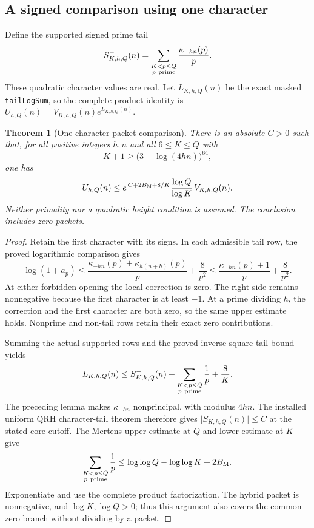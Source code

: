 \documentclass[11pt]{article}
\newtheorem{theorem}{Theorem}[section]
\begin{document}
\subsection{A signed comparison using one character}
Define the supported signed prime tail
\[
 S^-_{K,h,Q}(n)=
     \sum_{\substack{K<p\leq Q\\p\ {\rm prime}}}
                         \frac{\kappa_{-hn}(p)}p .
\]
These quadratic character values are real. Let \(L_{K,h,Q}(n)\)
be the exact masked \texttt{tailLogSum}, so the complete product
identity is \(U_{h,Q}(n)=V_{K,h,Q}(n)e^{L_{K,h,Q}(n)}\).

\begin{theorem}[One-character packet comparison]\label{thm:one-character-comparison}
There is an absolute \(C>0\) such that, for all positive integers
\(h,n\) and all \(6\leq K\leq Q\) with
\[
                   K+1\geq\bigl(3+\log(4hn)\bigr)^{64},
\]
one has
\[
 U_{h,Q}(n)\leq
 e^{\,C+2B_{\rm M}+8/K}\frac{\log Q}{\log K}\,
 V_{K,h,Q}(n).
\]
Neither primality nor a quadratic height condition is assumed.
The conclusion includes zero packets.
\end{theorem}
\begin{proof}
Retain the first character with its signs. In each admissible tail row,
the proved logarithmic comparison gives
\[
 \log(1+a_p)\leq
   \frac{\kappa_{-hn}(p)+\kappa_{h(n+h)}(p)}p+\frac8{p^2}
 \leq\frac{\kappa_{-hn}(p)+1}p+\frac8{p^2}.
\]
At either forbidden opening the local correction is zero. The right
side remains nonnegative because the first character is at least
\(-1\). At a prime dividing \(h\), the correction and the first
character are both zero, so the same upper estimate holds. Nonprime
and non-tail rows retain their exact zero contributions.

Summing the actual supported rows and the proved inverse-square tail
bound yields
\[
 L_{K,h,Q}(n)\leq
 S^-_{K,h,Q}(n)+
 \sum_{\substack{K<p\leq Q\\p\ {\rm prime}}}\frac1p+\frac8K .
\]
The preceding lemma makes \(\kappa_{-hn}\) nonprincipal, with modulus
\(4hn\). The installed uniform QRH character-tail theorem therefore
gives \(\lvert S^-_{K,h,Q}(n)\rvert\leq C\) at the stated core cutoff.
The Mertens upper estimate at \(Q\) and lower estimate at \(K\) give
\[
 \sum_{\substack{K<p\leq Q\\p\ {\rm prime}}}\frac1p
       \leq\log\log Q-\log\log K+2B_{\rm M}.
\]
Exponentiate and use the complete product factorization. The hybrid
packet is nonnegative, and \(\log K,\log Q>0\); thus this argument
also covers the common zero branch without dividing by a packet.
\end{proof}
\end{document}
